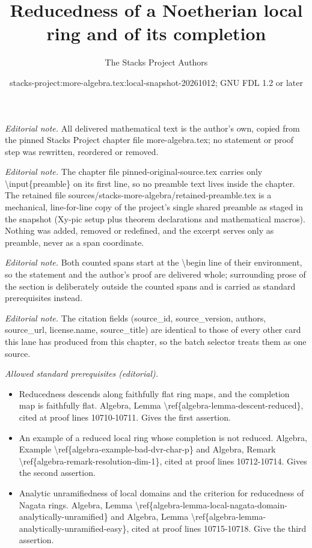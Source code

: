 \documentclass[10pt,a4paper]{amsart}
\title{Reducedness of a Noetherian local ring and of its completion}
\author{The Stacks Project Authors}
\date{stacks-project:more-algebra.tex:local-snapshot-20261012; GNU FDL 1.2 or later}
\theoremstyle{plain}
\theoremstyle{definition}
\theoremstyle{remark}
\numberwithin{equation}{subsection}
\begin{document}
\maketitle
\setcounter{subsection}{1}
\noindent\textit{Editorial note.} All delivered mathematical text is the author's own, copied from the pinned Stacks Project chapter file more-algebra.tex; no statement or proof step was rewritten, reordered or removed.\par\medskip
\noindent\textit{Editorial note.} The chapter file pinned-original-source.tex carries only \textbackslash{}input\{preamble\} on its first line, so no preamble text lives inside the chapter. The retained file sources/stacks-more-algebra/retained-preamble.tex is a mechanical, line-for-line copy of the project's single shared preamble as staged in the snapshot (Xy-pic setup plus theorem declarations and mathematical macros). Nothing was added, removed or redefined, and the excerpt serves only as preamble, never as a span coordinate.\par\medskip
\noindent\textit{Editorial note.} Both counted spans start at the \textbackslash{}begin line of their environment, so the statement and the author's proof are delivered whole; surrounding prose of the section is deliberately outside the counted spans and is carried as standard prerequisites instead.\par\medskip
\noindent\textit{Editorial note.} The citation fields (source\_id, source\_version, authors, source\_url, license.name, source\_title) are identical to those of every other card this lane has produced from this chapter, so the batch selector treats them as one source.\par\medskip
\noindent\textit{Allowed standard prerequisites (editorial).}\begin{itemize}
\item Reducedness descends along faithfully flat ring maps, and the completion map is faithfully flat. Algebra, Lemma \textbackslash{}ref\{algebra-lemma-descent-reduced\}, cited at proof lines 10710-10711. Gives the first assertion.
\item An example of a reduced local ring whose completion is not reduced. Algebra, Example \textbackslash{}ref\{algebra-example-bad-dvr-char-p\} and Algebra, Remark \textbackslash{}ref\{algebra-remark-resolution-dim-1\}, cited at proof lines 10712-10714. Gives the second assertion.
\item Analytic unramifiedness of local domains and the criterion for reducedness of Nagata rings. Algebra, Lemma \textbackslash{}ref\{algebra-lemma-local-nagata-domain-analytically-unramified\} and Algebra, Lemma \textbackslash{}ref\{algebra-lemma-analytically-unramified-easy\}, cited at proof lines 10715-10718. Give the third assertion.
\end{itemize}\medskip
\end{document}
